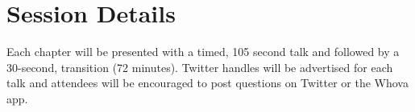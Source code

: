 \documentclass[sigconf]{acmart}
\begin{document}
\maketitle

\section{Session Details} 
Each chapter \cite{ch00, ch01, ch02, ch03, ch04, ch05, ch06, ch08, ch09, ch10, ch11, ch12, ch13, ch14, ch15, ch16, ch17, ch18, ch19, ch20, ch21, ch22, ch23, ch24, ch25, ch26, ch27, ch28, ch29, ch30, ch31}  will be presented with a timed, 105 second talk and followed by a 30-second, transition (72 minutes). Twitter handles will be advertised for each talk and attendees will be encouraged to post questions on Twitter or the Whova app.  
\end{document}

